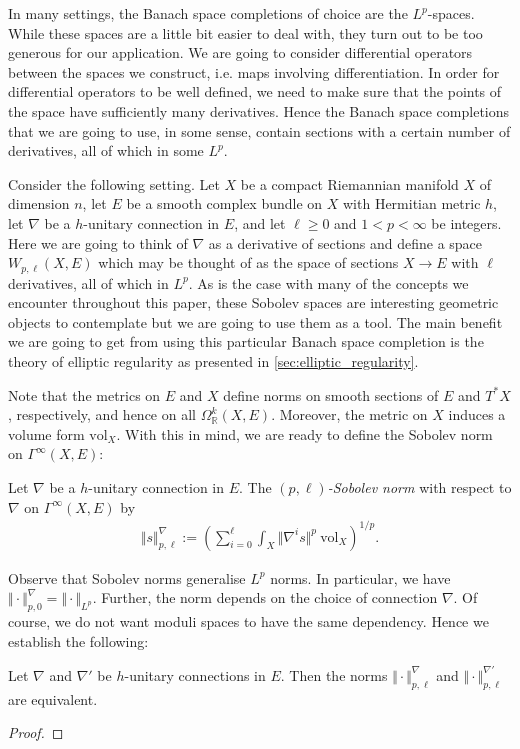 \documentclass[12pt]{ociamthesis}  %
\begin{document}
In many settings, the Banach space completions of choice are the
$L^p$-spaces. While these spaces are a little bit easier to deal with,
they turn out to be too generous for our application. We are going to
consider differential operators between the spaces we construct,
i.e. maps involving differentiation. In order for differential operators
to be well defined, we need to make sure that the points of the space
have sufficiently many derivatives. Hence the Banach space completions
that we are going to use, in some sense, contain sections with a
certain number of derivatives, all of which in some $L^p$.

Consider the following setting. Let $X$ be a compact
Riemannian manifold $X$ of dimension $n$, let $E$ be a smooth complex
bundle on $X$ with Hermitian metric $h$, let $\nabla$ be a $h$-unitary
connection in $E$, and let $\ell\geq 0$ and $1<p<\infty$ be integers.
Here we are going to think of $\nabla$ as a derivative of sections and
define a space $W_{p,\ell}(X,E)$ which may be thought of as the space of
sections $X\to E$ with $\ell$ derivatives, all of which in $L^p$. As
is the case with many of the concepts we encounter throughout this paper,
these Sobolev spaces are interesting geometric objects to
contemplate but we are going to use them as a tool. The main
benefit we are going to get from using this particular Banach space
completion is the theory of elliptic regularity as presented in
\ref{sec:elliptic_regularity}.

Note that the metrics on $E$ and $X$ define norms on smooth sections
of $E$ and $T^*X$, respectively, and hence on all
$\Omega^k_{\mathbb{R}}(X,E)$.
Moreover, the metric on $X$ induces a volume form $\text{vol}_X$.
With this in mind, we are ready to define the Sobolev norm on
$\Gamma^\infty(X,E)$:

\begin{definition}
  Let $\nabla$ be a $h$-unitary connection in $E$.
  The \emph{$(p,\ell)$-Sobolev norm} with respect to $\nabla$ on
  $\Gamma^\infty(X,E)$ by
  \begin{align*}
    \Vert s\Vert_{p,\ell}^\nabla := \left(
    \sum_{i=0}^\ell \int_X \Vert \nabla^i s \Vert^p\:\text{vol}_X
    \right)^{1/p}.
  \end{align*}
\end{definition}

Observe that Sobolev norms generalise $L^p$ norms. In particular,
we have $\Vert\cdot\Vert^\nabla_{p,0} = \Vert\cdot\Vert_{L^p}$.
Further, the norm depends on the choice of connection $\nabla$. Of
course, we do not want moduli spaces to have the same dependency. Hence
we establish the following:
\begin{lemma}
  Let $\nabla$ and $\nabla'$ be $h$-unitary connections in $E$. Then the
  norms $\Vert\cdot\Vert_{p,\ell}^\nabla$ and
  $\Vert\cdot\Vert_{p,\ell}^{\nabla'}$ are equivalent.
  \begin{proof}
    \missingproof
  \end{proof}
\end{lemma}
\end{document}
